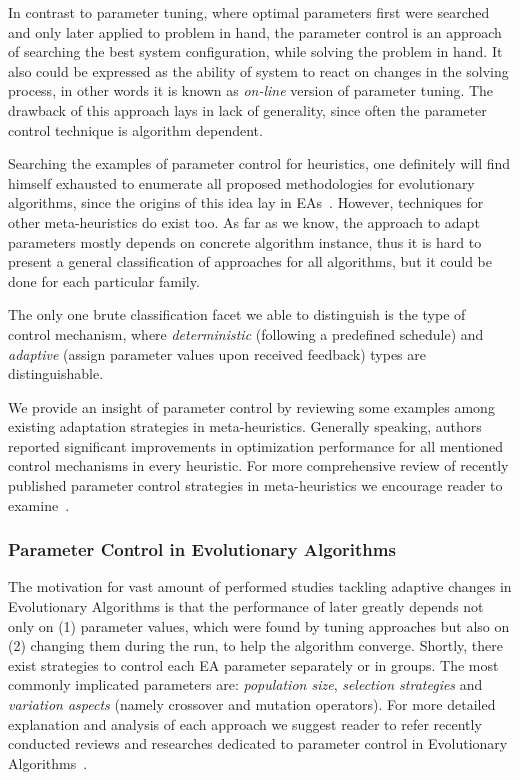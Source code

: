 In contrast to parameter tuning, where optimal parameters first were searched and only later applied to problem in hand, the parameter control is an approach of searching the best system configuration, while solving the problem in hand. It also could be expressed as the ability of system to react on changes in the solving process, in other words it is known as \textit{on-line} version of parameter tuning. The drawback of this approach lays in lack of generality, since  often the parameter control technique is algorithm dependent.

Searching the examples of parameter control for heuristics, one definitely will find himself exhausted to enumerate all proposed methodologies for evolutionary algorithms, since the origins of this idea lay in EAs~\cite{karafotias2014parameter}. However, techniques for other meta-heuristics do exist too.
As far as we know, the approach to adapt parameters mostly depends on concrete algorithm instance, thus it is hard to present a general classification of approaches for all algorithms, but it could be done for each particular family.

The only one brute classification facet we able to distinguish is the type of control mechanism, where \textit{deterministic} (following a predefined schedule) and \textit{adaptive} (assign parameter values upon received feedback) types are distinguishable.

We provide an insight of parameter control by reviewing some examples among existing adaptation strategies in meta-heuristics.
Generally speaking, authors reported significant improvements in optimization performance for all mentioned control mechanisms in every heuristic. For more comprehensive review of recently published parameter control strategies in meta-heuristics we encourage reader to examine~\cite{huang2019survey}.


\subsubsection{Parameter Control in Evolutionary Algorithms} 
The motivation for vast amount of performed studies tackling adaptive changes in Evolutionary Algorithms is that the performance of later greatly depends not only on (1) parameter values, which were found by tuning approaches but also on (2) changing them during the run, to help the algorithm converge.
Shortly, there exist strategies to control each EA parameter separately or in groups. The most commonly implicated parameters are: \textit{population size}, \textit{selection strategies} and \textit{variation aspects} (namely crossover and mutation operators). For more detailed explanation and analysis of each approach we suggest reader to refer recently conducted reviews and researches dedicated to parameter control in Evolutionary Algorithms~\cite{karafotias2014parameter,aleti2016systematic,smith2020self}.

